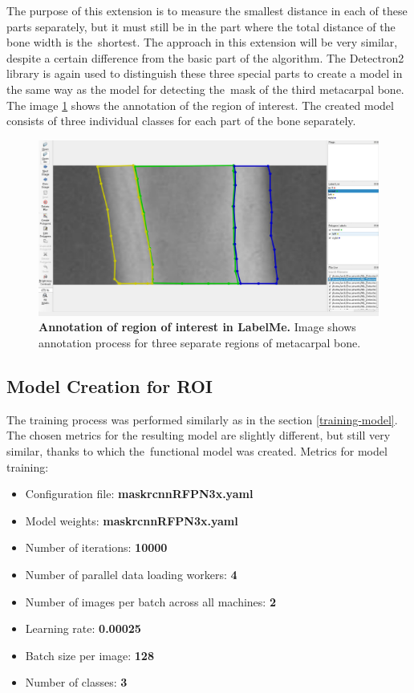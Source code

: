 The purpose of this extension is to measure the smallest distance in each of these parts separately, but it must still be in the part where the total distance of the bone width is the~shortest. The approach in this extension will be very similar, despite a certain difference from the basic part of the algorithm. The Detectron2 library is again used to distinguish these three special parts to create a model in the same way as the model for detecting the~mask of the third metacarpal bone. The image \ref{roi-annotation} shows the annotation of the region of interest. The created model consists of three individual classes for each part of the bone separately.

\begin{figure}[!ht]
    \centering
    \includegraphics[width=.75\textwidth]{obrazky-figures/ROI_annotation.pdf}
     \caption{\textbf{Annotation of region of interest in LabelMe.} Image shows annotation process for three separate regions of metacarpal bone.}
    \label{roi-annotation}
\end{figure}

\subsection{Model Creation for ROI}
The training process was performed similarly as in the section \ref{training-model}. The chosen metrics for the resulting model are slightly different, but still very similar, thanks to which the~functional model was created. Metrics for model training:
\begin{itemize}
  \item Configuration file: \textbf{mask\textunderscore rcnn\textunderscore R\textunderscore FPN\textunderscore 3x.yaml}
  \item Model weights: \textbf{mask\textunderscore rcnn\textunderscore R\textunderscore FPN\textunderscore 3x.yaml}
  \item Number of iterations: \textbf{10000}
  \item Number of parallel data loading workers: \textbf{4}
  \item Number of images per batch across all machines: \textbf{2}
  \item Learning rate: \textbf{0.00025}
  \item Batch size per image: \textbf{128}
  \item Number of classes: \textbf{3}
\end{itemize}

